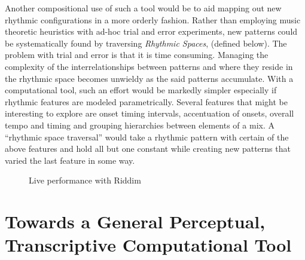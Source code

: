 Another compositional use of such a tool would be to aid mapping out 
new rhythmic configurations in a more orderly fashion.  Rather than 
employing music theoretic heuristics with ad-hoc trial and error 
experiments, new patterns could be systematically found by traversing 
{\it Rhythmic Spaces}, (defined below). The problem with trial and error 
is that it is time consuming. Managing the complexity of the
interrelationships between patterns and where they reside in the 
rhythmic space becomes unwieldy as the said patterns accumulate. With a 
computational tool, such an effort would be markedly simpler 
especially if rhythmic features are modeled parametrically. 
Several features that might be interesting to explore are 
onset timing intervals, accentuation of onsets, overall tempo 
and timing and grouping hierarchies between elements of a mix. 
A ``rhythmic space traversal'' would take a rhythmic pattern 
with certain of the above features and hold all but one constant 
while creating new patterns that varied the last feature in some way.

\begin{figure}[thp]
  \begin{center}
    \caption{Live performance with Riddim}
    \label{A real-time possibility of Riddim} 
  \end{center}
\end{figure}

\vspace{7mm}
\section{Towards a General Perceptual, Transcriptive Computational Tool}
\vspace{3mm}

